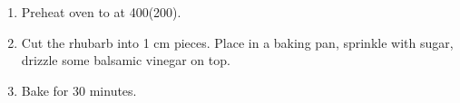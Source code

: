
\begin{ingredients}
\end{ingredients}


\begin{recipe}
  \begin{enumerate}

  \item Preheat oven to at 400\F (200\degreeC).

  \item Cut the rhubarb into 1 cm pieces.  Place in a baking pan,
    sprinkle with sugar, drizzle some balsamic vinegar on top.

  \item Bake for 30 minutes.

  \end{enumerate}
\end{recipe}
